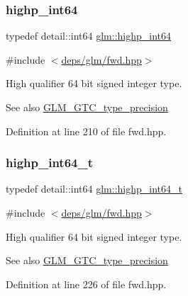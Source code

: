 \subsubsection{\texorpdfstring{highp\+\_\+int64}{highp\_int64}}
{\footnotesize\ttfamily typedef detail\+::int64 \hyperlink{group__gtc__type__precision_ga7ffb27943e9569800979081bc548621c}{glm\+::highp\+\_\+int64}}



{\ttfamily \#include $<$\hyperlink{fwd_8hpp}{deps/glm/fwd.\+hpp}$>$}

High qualifier 64 bit signed integer type. \begin{DoxySeeAlso}{See also}
\hyperlink{group__gtc__type__precision}{G\+L\+M\+\_\+\+G\+T\+C\+\_\+type\+\_\+precision} 
\end{DoxySeeAlso}


Definition at line 210 of file fwd.\+hpp.

\mbox{\label{group__gtc__type__precision_ga0f5186bde44471133b08057cae8a51ac}} 
\subsubsection{\texorpdfstring{highp\+\_\+int64\+\_\+t}{highp\_int64\_t}}
{\footnotesize\ttfamily typedef detail\+::int64 \hyperlink{group__gtc__type__precision_ga0f5186bde44471133b08057cae8a51ac}{glm\+::highp\+\_\+int64\+\_\+t}}



{\ttfamily \#include $<$\hyperlink{fwd_8hpp}{deps/glm/fwd.\+hpp}$>$}

High qualifier 64 bit signed integer type. \begin{DoxySeeAlso}{See also}
\hyperlink{group__gtc__type__precision}{G\+L\+M\+\_\+\+G\+T\+C\+\_\+type\+\_\+precision} 
\end{DoxySeeAlso}


Definition at line 226 of file fwd.\+hpp.

\mbox{\label{group__gtc__type__precision_ga57c86999e666760c304453f9bfdc09d1}} 
